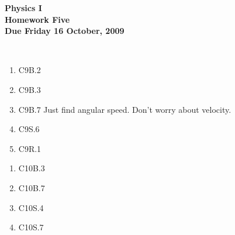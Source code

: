 \documentclass[12pt]{article}
\begin{document}
\pagestyle{empty}
 
\begin{center}
{\large {\bf Physics I}}\\
\medskip
{\large {\bf Homework Five}}\\
\medskip
{ {\bf Due Friday 16 October, 2009}}\\
\end{center}

\hspace{2mm}\\


\begin{enumerate}
\setlength{\itemsep}{-1mm}
  \item C9B.2
  \item C9B.3
  \item C9B.7  Just find angular speed.  Don't worry about velocity.
  \item C9S.6
  \item C9R.1
\end{enumerate}



\begin{enumerate}
\setlength{\itemsep}{-1mm}
  \item C10B.3
  \item C10B.7
  \item C10S.4
  \item C10S.7
\end{enumerate}
\end{document}
